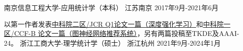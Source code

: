 \begin{educventries}
  \educventry
    {} %
    {南京信息工程大学-应用统计学（本科）} %
    {江苏南京} %
    {2017年9月-2021年6月}

  \educventry
    {以第一作者发表\href{https://www.frontiersin.org/articles/10.3389/fbioe.2022.827408/full}{中科院二区/JCR Q1论文一篇（深度强化学习）}和\href{https://www.sciencedirect.com/science/article/pii/S0020025523006497}{中科院一区/CCF-B 论文一篇（图神经网络推荐系统）}，另有两篇投稿至TKDE及AAAI-24。} %
    {浙江工商大学-理学统计学（硕士）} %
    {浙江杭州} %
    {2021年9月-2024年1月} %

\end{educventries}
